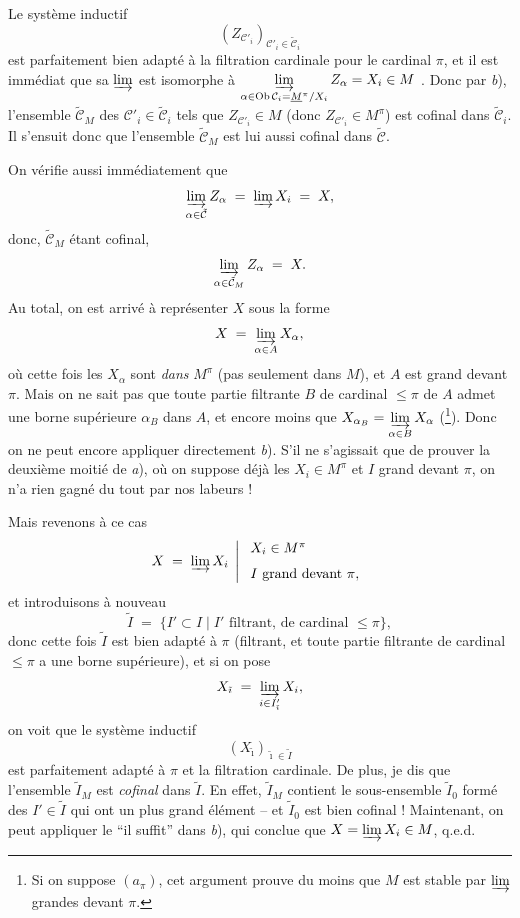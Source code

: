 \documentclass[11pt]{article}
\newcommand{\printedpage}[1]{\marginpar{\footnotesize p.~#1}}
\newcommand{\msp}[1]{\marginpar{\footnotesize [#1]}}
\begin{document}
Le système inductif
\[ (Z_{\mathcal{C}'_i})_{\mathcal{C}'_i\in\tilde{\mathcal{C}}_i} \]
est parfaitement bien adapté à la filtration cardinale pour le cardinal $\pi$, et il est immédiat que sa $\varinjlim$ est isomorphe à $\varinjlim\limits_{\alpha\in\operatorname{Ob}\mathcal{C}_i=\underline{M}^\pi/X_i} Z_\alpha = X_i\in M$ . Donc par \textit{b}), l'ensemble $\tilde{\mathcal{C}}_M$ des $\mathcal{C}'_i\in\tilde{\mathcal{C}}_i$ tels que $Z_{\mathcal{C}'_i}\in M$ (donc $Z_{\mathcal{C}'_i}\in M^\pi$) est cofinal dans $\tilde{\mathcal{C}}_i$. Il s'ensuit donc que l'ensemble $\tilde{\mathcal{C}}_M$ est lui aussi cofinal dans $\tilde{\mathcal{C}}$.

\printedpage{51}

\msp{page 95}On vérifie aussi immédiatement que
\[ \varinjlim_{\alpha\in\tilde{\mathcal{C}}} Z_\alpha \;=\; \varinjlim X_i \;=\; X, \]
donc, $\tilde{\mathcal{C}}_M$ étant cofinal,
\[ \varinjlim_{\alpha\in\tilde{\mathcal{C}}_M} Z_\alpha \;=\; X. \]
Au total, on est arrivé à représenter $X$ sous la forme
\[ X \;=\; \varinjlim_{\alpha\in A} X_\alpha, \]
où cette fois les $X_\alpha$ sont \textit{dans} $M^\pi$ (pas seulement dans $M$), et $A$ est grand devant $\pi$. Mais on ne sait pas que toute partie filtrante $B$ de cardinal $\le\pi$ de $A$ admet une borne supérieure $\alpha_B$ dans $A$, et encore moins que $X_{\alpha_B} = \varinjlim\limits_{\alpha\in B} X_\alpha$ (\footnote[45]{Si on suppose $(a_\pi)$, cet argument prouve du moins que $M$ est stable par $\varinjlim$ grandes devant $\pi$.}). Donc on ne peut encore appliquer directement \textit{b}). S'il ne s'agissait que de prouver la deuxième moitié de \textit{a}), où on suppose déjà les $X_i\in M^\pi$ et $I$ grand devant $\pi$, on n'a rien gagné du tout par nos labeurs !

\msp{page 96}Mais revenons à ce cas
\[ X \;=\; \varinjlim X_i \;\left|\; \begin{array}{l} X_i\in M^\pi \\[1.5ex] I \text{ grand devant } \pi, \end{array}\right. \]
et introduisons à nouveau
\[ \tilde{I} \;=\; \{I'\subset I \mid I' \text{ filtrant, de cardinal } \le\pi\}, \]
donc cette fois $\tilde{I}$ est bien adapté à $\pi$ (filtrant, et toute partie filtrante de cardinal $\le\pi$ a une borne supérieure), et si on pose
\[ X_{\tilde{\imath}} \;=\; \varinjlim_{i\in I'_{\tilde{\imath}}} X_i, \]
on voit que le système inductif
\[ (X_{\tilde{\imath}})_{\tilde{\imath}\in\tilde{I}} \]
est parfaitement adapté à $\pi$ et la filtration cardinale. De plus, je dis que l'ensemble $\tilde{I}_M$ est \textit{cofinal} dans $\tilde{I}$. En effet, $\tilde{I}_M$ contient le sous-ensemble $\tilde{I}_0$ formé des $I'\in\tilde{I}$ qui ont un plus grand élément -- et $\tilde{I}_0$ est bien cofinal ! Maintenant, on peut appliquer
\printedpage{52}
\msp{page 97}le ``il suffit'' dans \textit{b}), qui conclue que $X = \varinjlim X_i\in M$, q.e.d. %
\end{document}
